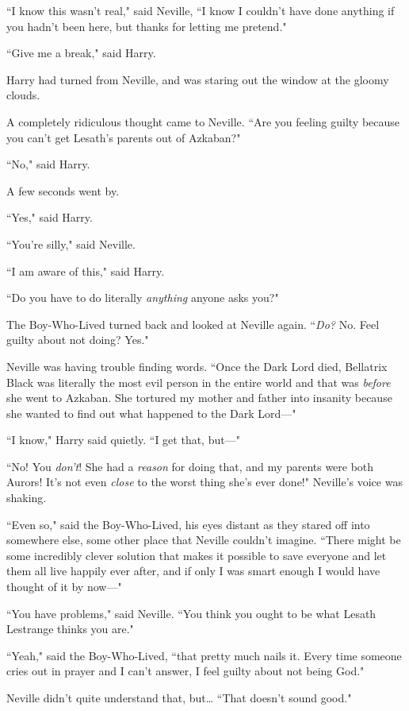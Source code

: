 ``I know this wasn't real," said Neville, ``I know I couldn't have done anything if you hadn't been here, but thanks for letting me pretend."

``Give me a break," said Harry.

Harry had turned from Neville, and was staring out the window at the gloomy clouds.

A completely ridiculous thought came to Neville. ``Are you feeling guilty because you can't get Lesath's parents out of Azkaban?"

``No," said Harry.

A few seconds went by.

``Yes," said Harry.

``You're silly," said Neville.

``I am aware of this," said Harry.

``Do you have to do literally \emph{anything} anyone asks you?"

The Boy-Who-Lived turned back and looked at Neville again. ``\emph{Do?} No. Feel guilty about not doing? Yes."

Neville was having trouble finding words. ``Once the Dark Lord died, Bellatrix Black was literally the most evil person in the entire world and that was \emph{before} she went to Azkaban. She tortured my mother and father into insanity because she wanted to find out what happened to the Dark Lord—"

``I know," Harry said quietly. ``I get that, but—"

``No! You \emph{don't}! She had a \emph{reason} for doing that, and my parents were both Aurors! It's not even \emph{close} to the worst thing she's ever done!" Neville's voice was shaking.

``Even so," said the Boy-Who-Lived, his eyes distant as they stared off into somewhere else, some other place that Neville couldn't imagine. ``There might be some incredibly clever solution that makes it possible to save everyone and let them all live happily ever after, and if only I was smart enough I would have thought of it by now—"

``You have problems," said Neville. ``You think you ought to be what Lesath Lestrange thinks you are."

``Yeah," said the Boy-Who-Lived, ``that pretty much nails it. Every time someone cries out in prayer and I can't answer, I feel guilty about not being God."

Neville didn't quite understand that, but{\ldots} ``That doesn't sound good."

